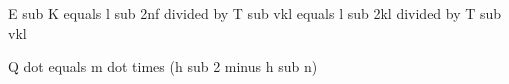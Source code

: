 E sub K equals l sub 2nf divided by T sub vkl equals l sub 2kl divided by T sub vkl

Q dot equals m dot times (h sub 2 minus h sub n)